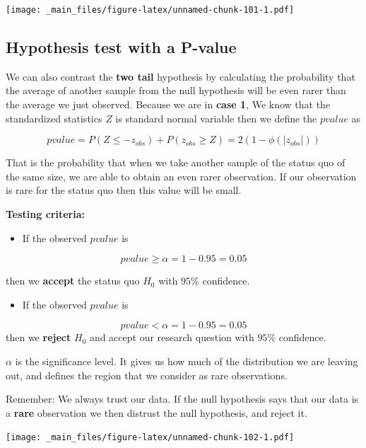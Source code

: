 \documentclass[
]{book}
\providecommand{\tightlist}{%
  \setlength{\itemsep}{0pt}\setlength{\parskip}{0pt}}
\begin{document}
\texttt{[image: \_main\_files/figure-latex/unnamed-chunk-101-1.pdf]}

\hypertarget{hypothesis-test-with-a-p-value}{%
\subsection{Hypothesis test with a P-value}\label{hypothesis-test-with-a-p-value}}

We can also contrast the \textbf{two tail} hypothesis by calculating the probability that the average of another sample from the null hypothesis will be even rarer than the average we just observed. Because we are in \textbf{case 1}, We know that the standardized statistics \(Z\) is standard normal variable then we define the \(pvalue\) as

\[pvalue = P(Z \leq -z_{obs}) + P(z_{obs} \geq Z) = 2 (1-\phi(|z_{obs}|))\]

That is the probability that when we take another sample of the status quo of the same size, we are able to obtain an even rarer observation. If our observation is rare for the status quo then this value will be small.

\textbf{Testing criteria:}

\begin{itemize}
\tightlist
\item
  If the observed \(pvalue\) is
\end{itemize}

\[pvalue \geq \alpha =1-0.95=0.05\]

then we \textbf{accept} the status quo \(H_0\) with \(95\%\) confidence.

\begin{itemize}
\tightlist
\item
  If the observed \(pvalue\) is
\end{itemize}

\[pvalue < \alpha =1-0.95=0.05\]
then we \textbf{reject} \(H_0\) and accept our research question with \(95\%\) confidence.

\(\alpha\) is the significance level. It gives us how much of the distribution we are leaving out, and defines the region that we consider as rare observations.

Remember: We always trust our data. If the null hypothesis says that our data is a \textbf{rare} observation we then distrust the null hypothesis, and reject it.

\texttt{[image: \_main\_files/figure-latex/unnamed-chunk-102-1.pdf]}
\end{document}
